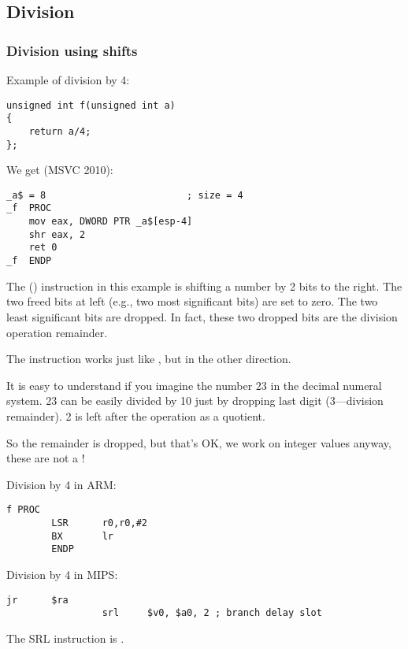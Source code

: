 \subsection{Division}

\subsubsection{Division using shifts}
\label{division_by_shifting}

Example of division by 4:

\begin{lstlisting}
unsigned int f(unsigned int a)
{
	return a/4;
};
\end{lstlisting}

We get (MSVC 2010):

\begin{lstlisting}[caption=MSVC 2010]
_a$ = 8							; size = 4
_f	PROC
	mov	eax, DWORD PTR _a$[esp-4]
	shr	eax, 2
	ret	0
_f	ENDP
\end{lstlisting}

\label{SHR}

The \SHR () instruction in this example is shifting a number by 2 bits to the right.
The two freed bits at left (e.g., two most significant bits) are set to zero.
The two least significant bits are dropped.
In fact, these two dropped bits are the division operation remainder.


The \SHR instruction works just like \SHL, but in the other direction.



It is easy to understand if you imagine the number 23 in the decimal numeral system.
23 can be easily divided by 10 just by dropping last digit (3---division remainder). 
2 is left after the operation as a \gls{quotient}.

So the remainder is dropped, but that's OK, we work on integer values anyway, 
these are not a !

Division by 4 in ARM:

\begin{lstlisting}[caption=\NonOptimizingKeilVI (\ARMMode)]
f PROC
        LSR      r0,r0,#2
        BX       lr
        ENDP
\end{lstlisting}

Division by 4 in MIPS:

\begin{lstlisting}[caption=\Optimizing GCC 4.4.5 (IDA)]
                 jr      $ra
                 srl     $v0, $a0, 2 ; branch delay slot
\end{lstlisting}

The SRL instruction is .
